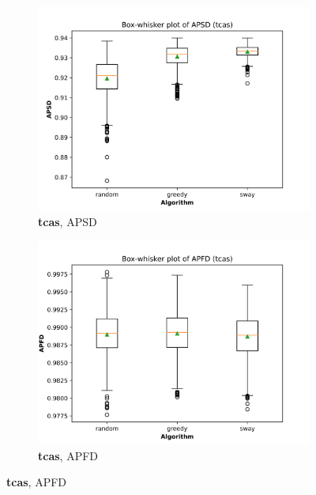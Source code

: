 \documentclass[10pt,journal,compsoc]{IEEEtran}
\begin{document}
	\begin{figure}
		\centering
		
		\begin{subfigure}[b]{0.4\linewidth}
			\centering
			\includegraphics[width=\textwidth]{figures/APSD_tcas.png}
			\caption{{\bf tcas}, APSD}
		\end{subfigure}
		\hfill
		\begin{subfigure}[b]{0.4\linewidth}
			\centering
			\includegraphics[width=\textwidth]{figures/APFD_tcas.png}
			\caption{{\bf tcas}, APFD}
		\end{subfigure}
		
		\vfill
		

\end{figure}
\end{document}

